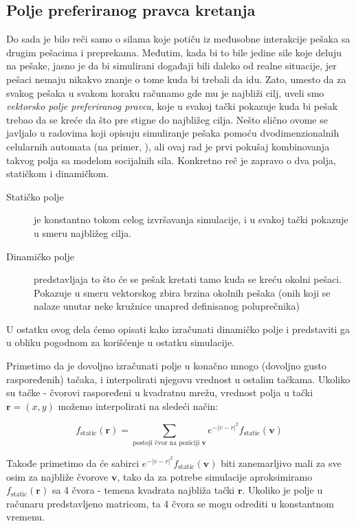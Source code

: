 \documentclass[12pt]{article}
\begin{document}
    \subsection{Polje preferiranog pravca kretanja}
    Do sada je bilo reči samo o silama koje potiču iz međusobne interakcije pešaka sa drugim pešacima i preprekama. Međutim, kada bi to bile jedine sile koje deluju na pešake, jasno je da bi simulirani događaji bili daleko od realne situacije, jer pešaci nemaju nikakvo znanje o tome kuda bi trebali da idu. Zato, umesto da za svakog pešaka u svakom koraku računamo gde mu je najbliži cilj, uveli smo \emph{vektorsko polje preferiranog pravca}, koje u svakoj tački pokazuje kuda bi pešak trebao da se kreće da što pre stigne do najbližeg cilja. Nešto slično ovome se javljalo u radovima koji opisuju simuliranje pešaka pomoću dvodimenzionalnih celularnih automata (na primer, \citep{Burstedde2001}), ali ovaj rad je prvi pokušaj kombinovanja takvog polja sa modelom socijalnih sila. Konkretno reč je zapravo o dva polja, statičkom i dinamičkom.
    \begin{description}
        \item[Statičko polje] je konstantno tokom celog izvršavanja simulacije, i u svakoj tački pokazuje u smeru najbližeg cilja.
        \item[Dinamičko polje] predstavljaja to što će se pešak kretati tamo kuda se kreću okolni pešaci. Pokazuje u smeru vektorskog zbira brzina okolnih pešaka (onih koji se nalaze unutar neke kružnice unapred definisanog poluprečnika)
    \end{description}
    U ostatku ovog dela ćemo opisati kako izračunati dinamičko polje i predstaviti ga u obliku pogodnom za korišćenje u ostatku simulacije. 
    
    Primetimo da je dovoljno izračunati polje u konačno mnogo (dovoljno gusto raspoređenih) tačaka, i interpolirati njegovu vrednost u ostalim tačkama. Ukoliko su tačke - čvorovi raspoređeni u kvadratnu mrežu, vrednost polja u tački $\mathbf r = (x,y)$ možemo interpolirati na sledeći način:
    
    $$
    	f_\text{static} (\mathbf r) = \sum_{\text{postoji čvor na poziciji } \mathbf v} e^{-|v-r|^2} f_\text{static} (\mathbf v)
    $$
	
	Takođe primetimo da će sabirci $e^{-|v-r|^2} f_\text{static} (\mathbf v)$ biti zanemarljivo mali za sve osim za najbliže čvorove $\mathbf v$, tako da za potrebe simulacije aproksimiramo $f_\text{static} (\mathbf r)$ sa 4 čvora - temena kvadrata najbliža tački $\mathbf r$. Ukoliko je polje u računaru predstavljeno matricom, ta 4 čvora se mogu odrediti u konstantnom vremenu.
	
\end{document}
